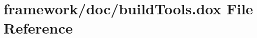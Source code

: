 \hypertarget{build_tools_8dox}{}\section{framework/doc/build\+Tools.dox File Reference}
\label{build_tools_8dox}
